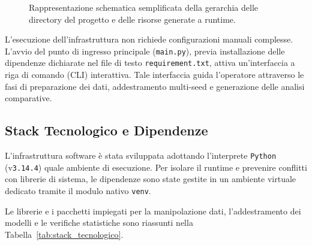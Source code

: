 \begin{figure}[H]
\small
{}
\caption{Rappresentazione schematica semplificata della gerarchia delle directory del progetto e delle risorse generate a runtime.}
\label{fig:struttura_repository}
\end{figure}

L'esecuzione dell'infrastruttura non richiede configurazioni manuali complesse. 
L'avvio del punto di ingresso principale (\texttt{main.py}), previa installazione delle dipendenze dichiarate nel file di testo \texttt{requirement.txt}, attiva un'interfaccia a riga di comando (CLI) interattiva. 
Tale interfaccia guida l'operatore attraverso le fasi di preparazione dei dati, addestramento multi-seed e generazione delle analisi comparative.

\subsection{Stack Tecnologico e Dipendenze}
\label{subsec:stack_tecnologico}

L'infrastruttura software è stata sviluppata adottando l'interprete \texttt{Python} (v\texttt{3.14.4}) quale ambiente di esecuzione. 
Per isolare il runtime e prevenire conflitti con librerie di sistema, le dipendenze sono state gestite in un ambiente virtuale dedicato tramite il modulo nativo \texttt{venv}.

Le librerie e i pacchetti impiegati per la manipolazione dati, l'addestramento dei modelli e le verifiche statistiche sono riassunti nella Tabella~\ref{tab:stack_tecnologico}.

